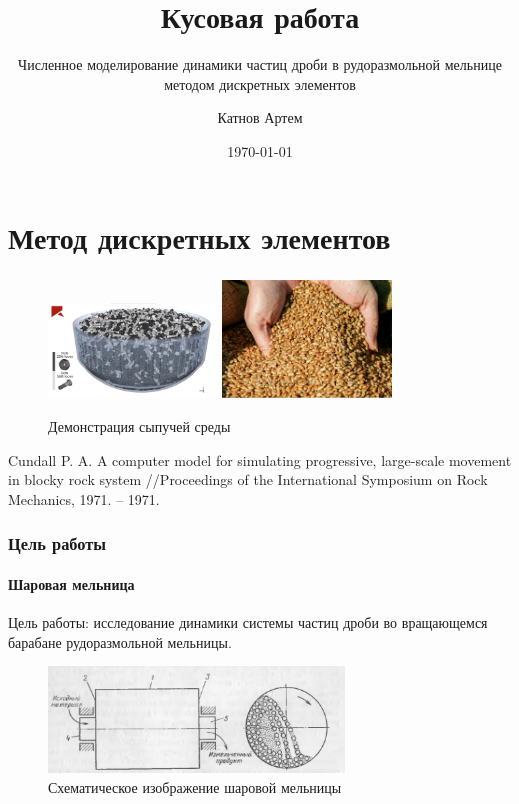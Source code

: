 \documentclass[c]{beamer}  %
\title{Кусовая работа}
\subtitle{Численное моделирование динамики частиц дроби в рудоразмольной мельнице методом дискретных элементов}
\author{Катнов Артем}
\date{\today}
\institute[Факультет робототехники и комплексной автоматизации]{Московский государственный технический университет им. Н.Э.Баумана}
\begin{document}
\begin{frame}
\maketitle
\end{frame}


\begin{frame}
\tableofcontents
\end{frame}

\section{Метод дискретных элементов}

\begin{frame}
\frametitle{\insertsection} 
\framesubtitle{\insertsubsection}

\begin{figure}[h!]
	\centering
	\includegraphics[width=0.4\textwidth]{sreda}
	\includegraphics[width=0.4\textwidth]{sreda2}
	\caption{Демонстрация сыпучей среды}
\end{figure} 

Cundall P. A. A computer model for simulating progressive, large-scale movement in blocky rock system //Proceedings of the International Symposium on Rock Mechanics, 1971. – 1971.

\end{frame}

\begin{frame}
\frametitle{Цель работы} 
\framesubtitle{Шаровая мельница}

Цель работы: исследование динамики системы частиц дроби во вращающемся барабане рудоразмольной мельницы.

\begin{figure}[h!]
	\centering
	\includegraphics[width=0.7\textwidth]{baraban_shema}
	\caption{Схематическое изображение шаровой мельницы}
\end{figure}

 
\end{frame}
\end{document}
